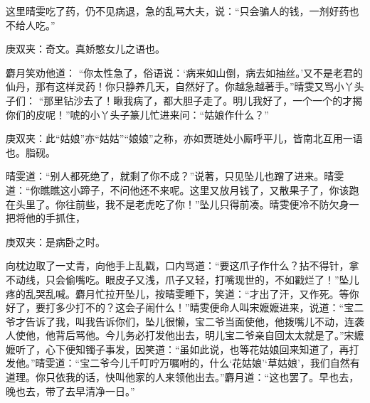 \begin{parag}
    这里晴雯吃了药，仍不见病退，急的乱骂大夫，说：“只会骗人的钱，一剂好药也不给人吃。”\begin{note}庚双夹：奇文。真娇憨女儿之语也。\end{note}麝月笑劝他道： “你太性急了，俗语说：‘病来如山倒，病去如抽丝。’又不是老君的仙丹，那有这样灵药！你只静养几天，自然好了。你越急越著手。”晴雯又骂小丫头子们： “那里钻沙去了！瞅我病了，都大胆子走了。明儿我好了，一个一个的才揭你们的皮呢！”唬的小丫头子篆儿忙进来问：“姑娘作什么？”\begin{note}庚双夹：此“姑娘”亦“姑姑”“娘娘”之称，亦如贾琏处小厮呼平儿，皆南北互用一语也。脂砚。\end{note}晴雯道：“别人都死绝了，就剩了你不成？”说著，只见坠儿也蹭了进来。晴雯道：“你瞧瞧这小蹄子，不问他还不来呢。这里又放月钱了，又散果子了，你该跑在头里了。你往前些，我不是老虎吃了你！”坠儿只得前凑。晴雯便冷不防欠身一把将他的手抓住，\begin{note}庚双夹：是病卧之时。\end{note}向枕边取了一丈青，向他手上乱戳，口内骂道：“要这爪子作什么？拈不得针，拿不动线，只会偷嘴吃。眼皮子又浅，爪子又轻，打嘴现世的，不如戳烂了！”坠儿疼的乱哭乱喊。麝月忙拉开坠儿，按晴雯睡下，笑道：“才出了汗，又作死。等你好了，要打多少打不的？这会子闹什么！”晴雯便命人叫宋嬷嬷进来，说道：“宝二爷才告诉了我，叫我告诉你们，坠儿很懒，宝二爷当面使他，他拨嘴儿不动，连袭人使他，他背后骂他。今儿务必打发他出去，明儿宝二爷亲自回太太就是了。”宋嬷嬷听了，心下便知镯子事发，因笑道：“虽如此说，也等花姑娘回来知道了，再打发他。”晴雯道：“宝二爷今儿千叮咛万嘱咐的，什么‘花姑娘’‘草姑娘’，我们自然有道理。你只依我的话，快叫他家的人来领他出去。”麝月道：“这也罢了。早也去，晚也去，带了去早清净一日。”
\end{parag}


